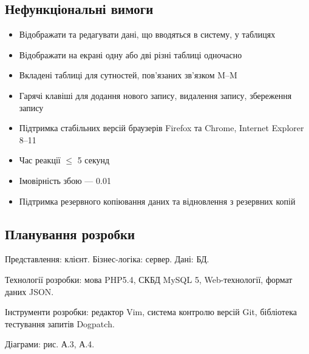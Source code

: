 \subsection{Нефункціональні вимоги}
\bigbreak
\begin{itemize}
 \item Відображати та редагувати дані, що вводяться в систему, у таблицях
 \item Відображати на екрані одну або дві різні таблиці одночасно
 \item Вкладені таблиці для сутностей, пов'язаних зв'язком M--M
 \item Гарячі клавіші для додання нового запису, видалення запису, збереження запису
 \item Підтримка стабільних версій браузерів Firefox та Chrome, Internet Explorer 8--11
 \item Час реакції $\leqslant$ 5 секунд
 \item Імовірність збою --- 0.01
 \item Підтримка резервного копіювання даних та відновлення з резервних копій
\end{itemize}
\bigbreak
\subsection{Планування розробки}
\bigbreak
Представлення: клієнт. Бізнес-логіка: сервер. Дані: БД.

Технології розробки: мова PHP5.4, СКБД MySQL 5, Web-технології, формат даних JSON.

Інструменти розробки: редактор Vim, система контролю версій Git, бібліотека тестування запитів Dogpatch.

Діаграми: рис. А.3, А.4.
